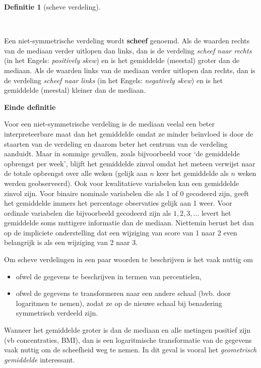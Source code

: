 \documentclass[
  dutch,
  letterpaper,
  12pt]{book}
\providecommand{\tightlist}{%
  \setlength{\itemsep}{0pt}\setlength{\parskip}{0pt}}
\theoremstyle{definition}
\theoremstyle{definition}
\newtheorem{definition}{Definitie}[chapter]
\theoremstyle{definition}
\theoremstyle{remark}
\begin{document}
\begin{definition}[scheve
verdeling]\protect\hypertarget{def-scheve-verdeling}{}\label{def-scheve-verdeling}

~

\end{definition}

Een niet-symmetrische verdeling wordt \textbf{scheef} genoemd. Als de
waarden rechts van de mediaan verder uitlopen dan links, dan is de
verdeling \emph{scheef naar rechts} (in het Engels: \emph{positively
skew}) en is het gemiddelde (meestal) groter dan de mediaan. Als de
waarden links van de mediaan verder uitlopen dan rechts, dan is de
verdeling \emph{scheef naar links} (in het Engels: \emph{negatively
skew}) en is het gemiddelde (meestal) kleiner dan de mediaan.

\textbf{Einde definitie}

Voor een niet-symmetrische verdeling is de mediaan veelal een beter
interpreteerbare maat dan het gemiddelde omdat ze minder beïnvloed is
door de staarten van de verdeling en daarom beter het centrum van de
verdeling aanduidt. Maar in sommige gevallen, zoals bijvoorbeeld voor
`de gemiddelde opbrengst per week', blijft het gemiddelde zinvol omdat
het meteen verwijst naar de totale opbrengst over alle weken (gelijk aan
\(n\) keer het gemiddelde als \(n\) weken werden geobserveerd). Ook voor
kwalitatieve variabelen kan een gemiddelde zinvol zijn. Voor binaire
nominale variabelen die als 1 of 0 gecodeerd zijn, geeft het gemiddelde
immers het percentage observaties gelijk aan 1 weer. Voor ordinale
variabelen die bijvoorbeeld gecodeerd zijn als \(1, 2, 3, ...\) levert
het gemiddelde soms nuttigere informatie dan de mediaan. Niettemin
berust het dan op de impliciete onderstelling dat een wijziging van
score van 1 naar 2 even belangrijk is als een wijziging van 2 naar 3.

Om scheve verdelingen in een paar woorden te beschrijven is het vaak
nuttig om

\begin{itemize}
\tightlist
\item
  ofwel de gegevens te beschrijven in termen van percentielen,
\item
  ofwel de gegevens te transformeren naar een andere schaal (bvb. door
  logaritmen te nemen), zodat ze op de nieuwe schaal bij benadering
  symmetrisch verdeeld zijn.
\end{itemize}

Wanneer het gemiddelde groter is dan de mediaan en alle metingen
positief zijn (vb concentraties, BMI), dan is een logaritmische
transformatie van de gegevens vaak nuttig om de scheefheid weg te nemen.
In dit geval is vooral het \emph{geometrisch gemiddelde} interessant.
\end{document}
